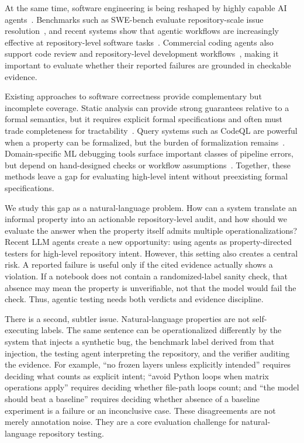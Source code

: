 \documentclass[11pt]{article}
\begin{document}
At the same time, software engineering is being reshaped by highly capable AI agents~\citep{metr2025longtasks}.
Benchmarks such as SWE-bench evaluate repository-scale issue resolution~\citep{jimenez2024swebench,swebench-verified}, and recent systems show that agentic workflows are increasingly effective at repository-level software tasks~\citep{xia2024agentless,guo2025repoaudit}.
Commercial coding agents also support code review and repository-level development workflows~\citep{openai_codex}, making it important to evaluate whether their reported failures are grounded in checkable evidence.

Existing approaches to software correctness provide complementary but incomplete coverage.
Static analysis can provide strong guarantees relative to a formal semantics, but it requires explicit formal specifications and often must trade completeness for tractability~\citep{cousot1979systematic,nielson1999principles}.
Query systems such as CodeQL are powerful when a property can be formalized, but the burden of formalization remains~\citep{codeql}.
Domain-specific ML debugging tools surface important classes of pipeline errors, but depend on hand-designed checks or workflow assumptions~\citep{schoop2021umlaut,traincheck,kang2020assertions,naik2024torchql}.
Together, these methods leave a gap for evaluating high-level intent without preexisting formal specifications.

We study this gap as a natural-language problem.
How can a system translate an informal property into an actionable repository-level audit, and how should we evaluate the answer when the property itself admits multiple operationalizations?
Recent LLM agents create a new opportunity: using agents as property-directed testers for high-level repository intent.
However, this setting also creates a central risk.
A reported failure is useful only if the cited evidence actually shows a violation.
If a notebook does not contain a randomized-label sanity check, that absence may mean the property is unverifiable, not that the model would fail the check.
Thus, agentic testing needs both verdicts and evidence discipline.

There is a second, subtler issue.
Natural-language properties are not self-executing labels.
The same sentence can be operationalized differently by the system that injects a synthetic bug, the benchmark label derived from that injection, the testing agent interpreting the repository, and the verifier auditing the evidence.
For example, ``no frozen layers unless explicitly intended'' requires deciding what counts as explicit intent; ``avoid Python loops when matrix operations apply'' requires deciding whether file-path loops count; and ``the model should beat a baseline'' requires deciding whether absence of a baseline experiment is a failure or an inconclusive case.
These disagreements are not merely annotation noise.
They are a core evaluation challenge for natural-language repository testing.
\end{document}
